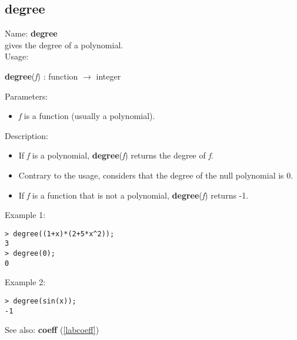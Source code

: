 \subsection{degree}
\label{labdegree}
\noindent Name: \textbf{degree}\\
gives the degree of a polynomial.\\
\noindent Usage: 
\begin{center}
\textbf{degree}(\emph{f}) : \textsf{function} $\rightarrow$ \textsf{integer}
\end{center}
Parameters: 
\begin{itemize}
\item \emph{f} is a function (usually a polynomial).
\end{itemize}
\noindent Description: \begin{itemize}

\item If \emph{f} is a polynomial, \textbf{degree}(\emph{f}) returns the degree of \emph{f}.

\item Contrary to the usage, \sollya considers that the degree of the null polynomial
   is 0.

\item If \emph{f} is a function that is not a polynomial, \textbf{degree}(\emph{f}) returns -1.
\end{itemize}
\noindent Example 1: 
\begin{center}\begin{minipage}{15cm}\begin{Verbatim}[frame=single]
> degree((1+x)*(2+5*x^2));
3
> degree(0);
0
\end{Verbatim}
\end{minipage}\end{center}
\noindent Example 2: 
\begin{center}\begin{minipage}{15cm}\begin{Verbatim}[frame=single]
> degree(sin(x));
-1
\end{Verbatim}
\end{minipage}\end{center}
See also: \textbf{coeff} (\ref{labcoeff})
